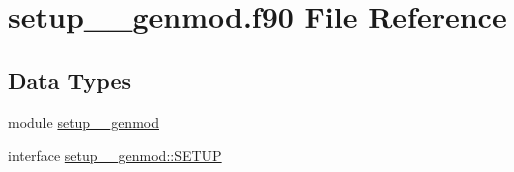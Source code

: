 \hypertarget{setup____genmod_8f90}{\section{setup\+\_\+\+\_\+genmod.\+f90 File Reference}
\label{setup____genmod_8f90}
}
\subsection*{Data Types}
\begin{DoxyCompactItemize}
\item 
module \hyperlink{classsetup____genmod}{setup\+\_\+\+\_\+genmod}
\item 
interface \hyperlink{interfacesetup____genmod_1_1SETUP}{setup\+\_\+\+\_\+genmod\+::\+S\+E\+T\+U\+P}
\end{DoxyCompactItemize}
